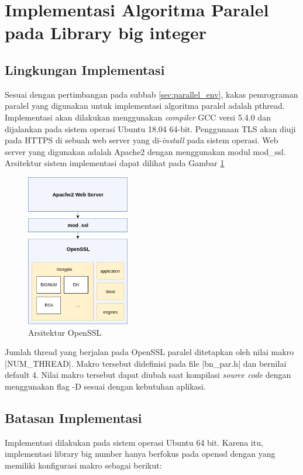 \section{Implementasi Algoritma Paralel pada Library big integer}
  \subsection{Lingkungan Implementasi} \label{sec:impl_env}
    Sesuai dengan pertimbangan pada subbab \ref{sec:parallel_env}, kakas pemrograman paralel yang digunakan untuk implementasi algoritma paralel adalah pthread. Implementasi akan dilakukan menggunakan \textit{compiler} GCC versi 5.4.0 dan dijalankan pada sistem operasi Ubuntu 18.04 64-bit. Penggunaan TLS akan diuji pada HTTPS di sebuah web server yang di-\textit{install} pada sistem operasi. Web server yang digunakan adalah Apache2 dengan menggunakan modul mod\_ssl. Arsitektur sistem implementasi dapat dilihat pada Gambar \ref{fig:openssl_arch}

    \begin{figure}[h]
      \centering
      \includegraphics[width=0.4\textwidth]{resources/img/ch-4/implementation_arch.png}
      \caption{Arsitektur OpenSSL}
      \label{fig:openssl_arch}
    \end{figure}

    Jumlah thread yang berjalan pada OpenSSL paralel ditetapkan oleh nilai makro |NUM_THREAD|. Makro tersebut didefinisi pada file |bn_par.h| dan bernilai default 4. Nilai makro tersebut dapat diubah saat kompilasi \textit{source code} dengan menggunakan flag -D sesuai dengan kebutuhan aplikasi.


  \subsection{Batasan Implementasi}
    Implementasi dilakukan pada sistem operasi Ubuntu 64 bit. Karena itu, implementasi library big number hanya berfokus pada openssl dengan yang memiliki konfigurasi makro sebagai berikut:

